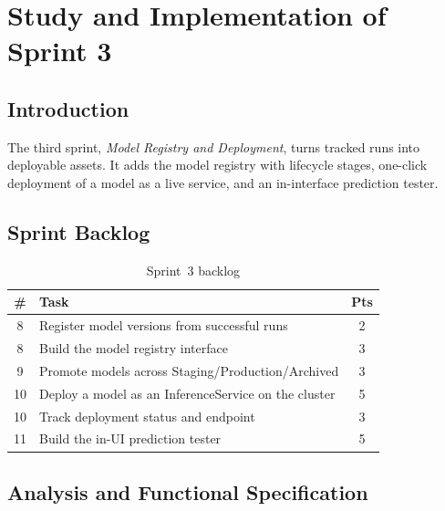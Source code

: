 \chapter{Study and Implementation of Sprint 3}
\label{chap:sprint3}

\section*{Introduction}
The third sprint, \emph{Model Registry and Deployment}, turns tracked runs into
deployable assets. It adds the model registry with lifecycle stages, one-click
deployment of a model as a live service, and an in-interface prediction tester.

\section{Sprint Backlog}
\begin{table}[H]\centering
\renewcommand{\arraystretch}{1.25}
\caption{Sprint~3 backlog}\label{tab:backlog-s3}
\begin{tabularx}{\textwidth}{|c|X|c|}
\hline
\textbf{\#} & \textbf{Task} & \textbf{Pts}\\
\hline
8  & Register model versions from successful runs & 2\\ \hline
8  & Build the model registry interface & 3\\ \hline
9  & Promote models across Staging/Production/Archived & 3\\ \hline
10 & Deploy a model as an InferenceService on the cluster & 5\\ \hline
10 & Track deployment status and endpoint & 3\\ \hline
11 & Build the in-UI prediction tester & 5\\ \hline
\end{tabularx}
\end{table}

\section{Analysis and Functional Specification}

